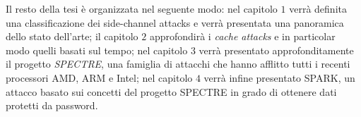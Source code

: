 	 Il resto della tesi è organizzata nel seguente modo: nel capitolo $1$ verrà definita una classificazione dei side-channel attacks e verrà presentata una panoramica dello stato dell'arte; il capitolo $2$ approfondirà i \emph{cache attacks} e in particolar modo quelli basati sul tempo; nel capitolo $3$ verrà presentato approfonditamente il progetto \emph{SPECTRE}, una famiglia di attacchi che hanno afflitto tutti i recenti processori AMD, ARM e Intel; nel capitolo $4$ verrà infine presentato \ac{SPARK}, un attacco basato sui concetti del progetto SPECTRE in grado di ottenere dati protetti da password.
